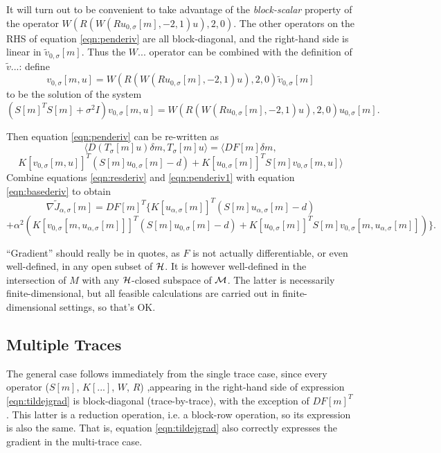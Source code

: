 It will turn out to be convenient to take advantage of the {\em
  block-scalar} property of the operator
$W(R(W(Ru_{0,\sigma}[m],-2,1)u),2,0)$. The other operators on the RHS
of equation \ref{eqn:penderiv} are all block-diagonal, and the
right-hand side is linear in $\tilde{v}_{0,\sigma}[m]$. Thus the
$W...$ operator can be combined with the definition of $\tilde{v}...$:
define
\[
  v_{0,\sigma}[m,u]=W(R(W(Ru_{0,\sigma}[m],-2,1)u),2,0) \tilde{v}_{0,\sigma}[m]
\]
to be the solution of the system
\begin{equation}
  \label{eqn:defv0}
  (S[m]^TS[m]+ \sigma^2I) v_{0,\sigma}[m,u] = W(R(W(Ru_{0,\sigma}[m],-2,1)u),2,0) u_{0,\sigma}[m].
\end{equation}

Then equation \ref{eqn:penderiv} can be re-written as
\[
  \langle D(T_{\sigma}[m]u)\delta m, T_{\sigma}[m]u\rangle = \langle DF[m]\delta m, 
\]
\begin{equation}
  \label{eqn:penderiv1}
   K[v_{0,\sigma}[m,u]]^T(S[m]u_{0,\sigma}[m]-d)
+
K[u_{0,\sigma}[m]]^T S[m]v_{0,\sigma}[m,u]\rangle
\end{equation}
Combine equations \ref{eqn:resderiv} and \ref{eqn:penderiv1} with
equation \ref{eqn:basederiv} to obtain
\[
  \nabla \tilde{J}_{\alpha,\sigma}[m] =
  DF[m]^T\{ K[u_{\alpha,\sigma}[m]]^T (S[m]u_{\alpha,\sigma}[m]-d)
\]
\begin{equation}
  \label{eqn:tildejgrad}
  + \alpha^2 (
  K[v_{0,\sigma}[m, u_{\alpha,\sigma}[m]]]^T(S[m]u_{0,\sigma}[m]-d)
+ K[u_{0,\sigma}[m]]^T S[m]v_{0,\sigma}[m,u_{\alpha,\sigma}[m]]) \}.
\end{equation}

 ``Gradient'' should really be in quotes, as $F$ is not actually differentiable, or even well-defined, in any open subset of ${\cal H}$. It is however well-defined in the intersection of $M$ with any ${\cal H}$-closed subspace of ${\cal M}$. The latter is necessarily finite-dimensional, but all feasible calculations are carried out in finite-dimensional settings, so that's OK.
 
\subsection{Multiple Traces}
The general case follows immediately from the single trace case, since
every operator ($S[m]$, $K[...]$, $W$, $R$) ,appearing in the right-hand side of expression
\ref{eqn:tildejgrad} is block-diagonal (trace-by-trace), with the exception
of $DF[m]^T$. This latter is a reduction operation, i.e. a block-row
operation, so its expression is also the same. That is, equation
\ref{eqn:tildejgrad} also correctly expresses the gradient in the
multi-trace case.

